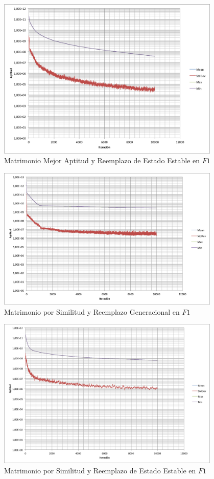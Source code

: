 \documentclass{llncs}
\begin{document}
\begin{figure}
  \centering
    \includegraphics[width=0.95\textwidth]{bestFitSteady}
  \caption{Matrimonio Mejor Aptitud  y Reemplazo de Estado Estable en  $F1$}
  \label{Ejecucion_2}
\end{figure}


\begin{figure}
  \centering
    \includegraphics[width=0.95\textwidth]{similarityGen}
  \caption{Matrimonio por Similitud  y Reemplazo Generacional en $F1$}
  \label{Ejecucion_3}
\end{figure}

\begin{figure}
  \centering
    \includegraphics[width=0.95\textwidth]{similaritySteady}
  \caption{Matrimonio por Similitud  y Reemplazo de Estado Estable en $F1$}
  \label{Ejecucion_4}
\end{figure}
\end{document}
